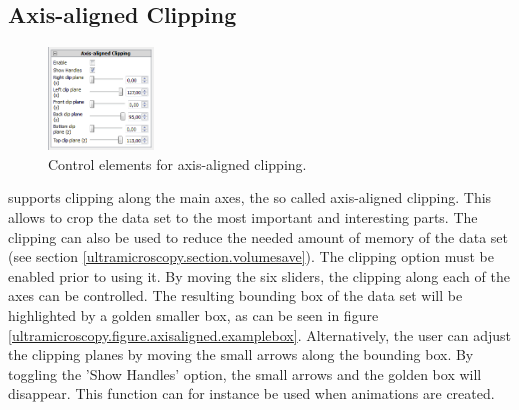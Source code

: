 \subsection{Axis-aligned Clipping}\label{ultramicroscopy.section.axisaligned}
\begin{minipage}{\textwidth}
\begin{figure}
\vspace*{-1cm}
\centering
\includegraphics[width=0.25\textwidth]{images/aligned_clipping.png}
\caption{Control elements for axis-aligned clipping.}
\label{ultramicroscopy.figure.axisaligned}
\end{figure}
\Voreen supports clipping along the main axes, the so called axis-aligned clipping. 
This allows to crop the data set to the most important and interesting parts. 
The clipping can also be used to reduce the needed amount of memory of the data set 
(see section \ref{ultramicroscopy.section.volumesave}). 
The clipping option must be enabled prior to using it. 
By moving the six sliders, the clipping along each of the axes can be controlled. 
The resulting bounding box of the data set will be highlighted by a golden smaller box, 
as can be seen in figure \ref{ultramicroscopy.figure.axisaligned.examplebox}. 
Alternatively, the user can adjust the clipping planes by moving the small arrows along the bounding box. 
By toggling the 'Show Handles' option, the small arrows and the golden box will disappear. 
This function can for instance be used when animations are created.
\end{minipage}
